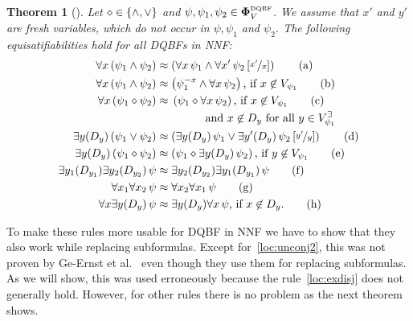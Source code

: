 \documentclass[
  digital, %
  color,
  twoside, %
  table,   %
  nolof,     %
  nolot,     %
]{fithesis3}
\let\setbuilder\set
\newcommand{\simpleset}[1]{\{{#1}\}}
\renewcommand{\set}[1]{\normalexpandarg\IfSubStr{#1}{|}{\setbuilder{#1}}{\simpleset{#1}}}
\newtheorem{theorem}{Theorem}[chapter] %
\theoremstyle{definition}
\theoremstyle{remark}
\newcommand{\substitute}[2]{\left[ \nicefrac{#2}{#1} \right]}
\newcommand{\DQBF}[1]{\mathbf{\Phi}_{#1}^{\normalfont{\text{\tiny DQBF}}}}
\newcommand{\evars}[1]{V_{#1}^{\exists}}
\newcommand{\itholds}{\,}
\begin{document}
\begin{theorem}[{\cite[Theorems 3,4]{HQSquantifierLocalisation}}]
\label{thrm:quantLocalEq}
  Let ${\diamond} \in \set{{\land},{\lor}}$ and $\psi,\psi_1,\psi_2 \in \DQBF{V}$. We assume that $x'$ and $y'$ are fresh variables, which do not occur in $\psi,\psi_1$ and $\psi_2$. The following equisatifiabilities hold for all DQBFs in NNF:
  \begin{align}
      \forall x \itholds (\psi_1 \land \psi_2) &\approx \left(\forall x \itholds \psi_1 \land \forall x' \itholds \psi_2\substitute{x}{x'}\right) \tag{a} \label{loc:unconj1} \\
      \forall x \itholds (\psi_1 \land \psi_2) &\approx \left(\psi_1^{-x} \land \forall x \itholds \psi_2\right) \text{, if } x \not\in V_{\psi_1} \tag{b} \label{loc:unconj2} \\
      \forall x \itholds (\psi_1 \diamond \psi_2) &\approx \begin{multlined}[t][3cm]\left(\psi_1 \diamond \forall x \itholds \psi_2\right) \text{, if } x \not\in V_{\psi_1} \tag{c} \label{loc:undisj} \\
      \text{ and } x \not\in D_y \text{ for all } y \in \evars{\psi_1}\end{multlined} \\
      \exists y(D_y) \itholds (\psi_1 \lor \psi_2) &\approx \left(\exists y(D_y) \itholds \psi_1 \lor \exists y'(D_y) \itholds \psi_2\substitute{y}{y'}\right) \tag{d} \label{loc:exdisj} \\
      \exists y(D_y) \itholds (\psi_1 \diamond \psi_2) &\approx \left(\psi_1 \diamond \exists y(D_y) \itholds \psi_2\right) \text{, if } y \not\in V_{\psi_1} \tag{e} \label{loc:exboth} \\
      \exists y_1(D_{y_1})\exists y_2(D_{y_2}) \itholds \psi &\approx \exists y_2(D_{y_2}) \exists y_1(D_{y_1}) \itholds \psi \tag{f} \label{loc:exswap} \\
      \forall x_1\forall x_2 \itholds \psi &\approx \forall x_2\forall x_1 \itholds \psi \tag{g} \label{loc:unswap} \\
      \forall x\exists y(D_y) \itholds \psi &\approx \exists y(D_y)\forall x \itholds \psi\text{, if } x \not\in D_y. \tag{h} \label{loc:bothswap}
  \end{align}
\end{theorem}

To make these rules more usable for DQBF in NNF we have to show that they also work while replacing subformulas. Except for~\eqref{loc:unconj2}, this was not proven by Ge-Ernst et al.~\cite{HQSquantifierLocalisation} even though they use them for replacing subformulas. As we will show, this was used erroneously because the rule~\eqref{loc:exdisj} does not generally hold. However, for other rules there is no problem as the next theorem shows.
\end{document}
